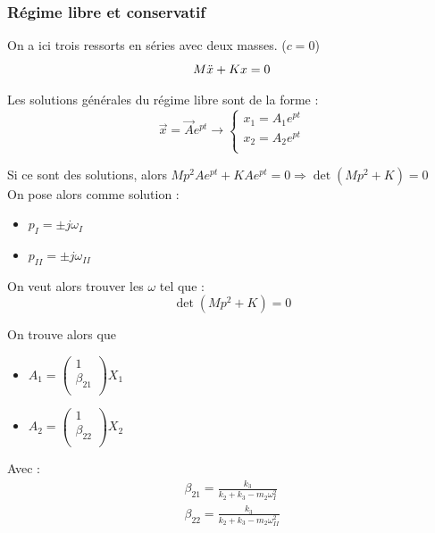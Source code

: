 \documentclass[../main.tex]{subfiles}
\begin{document}
\subsubsection{Régime libre et conservatif}
On a ici trois ressorts en séries avec deux masses. ($c=0$)\\
\begin{equation}
    M\Ddot{x} + Kx=0
\end{equation}

Les solutions générales du régime libre sont de la forme : \begin{equation}
    \Vec{x} = \Vec{A} e^{pt} \rightarrow \begin{cases}
        x_1 = A_1 e^{pt}\\
        x_2 = A_2 e^{pt}\\
    \end{cases}
\end{equation}

Si ce sont des solutions, alors $Mp^2Ae^{pt} + KAe^{pt} = 0 \Rightarrow \det(Mp^2+K)=0$\\

On pose alors comme solution : \begin{itemize}
    \item $p_I = \pm j \omega_I$\\
    \item $p_{II} = \pm j \omega_{II}$\\
\end{itemize}

On veut alors trouver les $\omega$ tel que : \begin{equation}
    \det(Mp^2+K)=0
\end{equation}

On trouve alors que \begin{itemize}
    \item $A_1 = \begin{pmatrix}
        1\\ \beta_{21}\\
    \end{pmatrix}X_1$\\
    \item $A_2 = \begin{pmatrix}
        1\\ \beta_{22}\\
    \end{pmatrix}X_2$
\end{itemize}

Avec : \begin{equation}
\begin{gathered}
    \beta_{21} = \frac{k_3}{k_2+k_3-m_2\omega_I^2}\\
    \beta_{22} = \frac{k_3}{k_2+k_3-m_2\omega_{II}^2}\\
    \end{gathered}
\end{equation}
\end{document}

